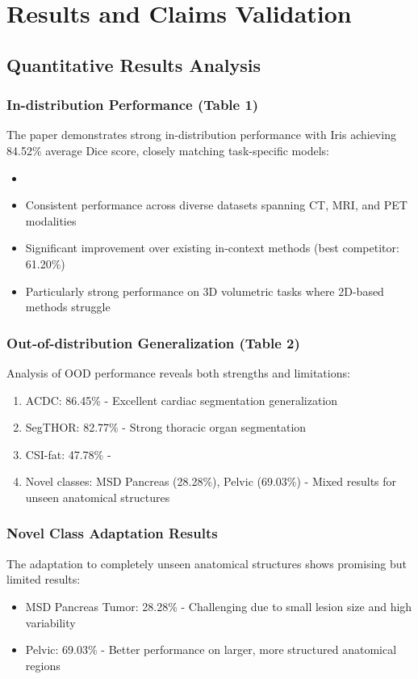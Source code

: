 \section*{Results and Claims Validation}
\label{sec:results_validation}

\subsection{Quantitative Results Analysis}
\subsubsection{In-distribution Performance (Table 1)}
The paper demonstrates strong in-distribution performance with Iris achieving 84.52\% average Dice score, closely matching task-specific models:
\begin{itemize}
    \item {}
    \item Consistent performance across diverse datasets spanning CT, MRI, and PET modalities
    \item Significant improvement over existing in-context methods (best competitor: 61.20\%)
    \item Particularly strong performance on 3D volumetric tasks where 2D-based methods struggle
\end{itemize}

\subsubsection{Out-of-distribution Generalization (Table 2)}
Analysis of OOD performance reveals both strengths and limitations:
\begin{enumerate}
    \item ACDC: 86.45\% - Excellent cardiac segmentation generalization
    \item SegTHOR: 82.77\% - Strong thoracic organ segmentation
    \item CSI-fat: 47.78\% - 
    \item Novel classes: MSD Pancreas (28.28\%), Pelvic (69.03\%) - Mixed results for unseen anatomical structures
\end{enumerate}

\subsubsection{Novel Class Adaptation Results}
The adaptation to completely unseen anatomical structures shows promising but limited results:
\begin{itemize}
    \item MSD Pancreas Tumor: 28.28\% - Challenging due to small lesion size and high variability
    \item Pelvic: 69.03\% - Better performance on larger, more structured anatomical regions
\end{itemize}

